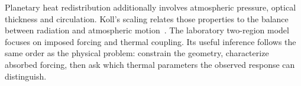Planetary heat redistribution additionally involves atmospheric pressure, optical thickness and circulation. Koll's scaling relates those properties to the balance between radiation and atmospheric motion~\cite{koll2022}. The laboratory two-region model focuses on imposed forcing and thermal coupling. Its useful inference follows the same order as the physical problem: constrain the geometry, characterize absorbed forcing, then ask which thermal parameters the observed response can distinguish.
